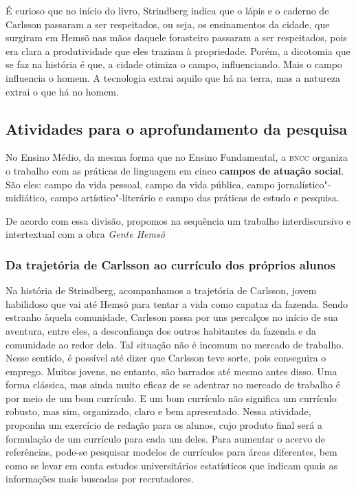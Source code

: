 \documentclass[12pt]{extarticle}
\begin{document}


É curioso que no início do livro, Strindberg indica que o lápis e o
caderno de Carlsson passaram a ser respeitados, ou seja, os ensinamentos
da cidade, que surgiram em Hemsö nas mãos daquele forasteiro passaram a
ser respeitados, pois era clara a produtividade que eles traziam à
propriedade. Porém, a dicotomia que se faz na história é que, a cidade
otimiza o campo, influenciando. Mais o campo influencia o homem. A
tecnologia extrai aquilo que há na terra, mas a natureza extrai o que há
no homem.




\subsection{Atividades para o aprofundamento da pesquisa}


No Ensino Médio, da mesma forma que no Ensino Fundamental, a \textsc{bncc}
organiza o trabalho com as práticas de linguagem em cinco \textbf{campos
de atuação social}. São eles: campo da vida pessoal, campo da vida
pública, campo jornalístico"-midiático, campo artístico"-literário e campo
das práticas de estudo e pesquisa.

De acordo com essa divisão, propomos na sequência um trabalho
interdiscursivo e intertextual com a obra \emph{Gente Hemsö}

\subsubsection{Da trajetória de Carlsson ao currículo dos próprios alunos}

Na história de Strindberg, acompanhamos a trajetória de Carlsson,
jovem habilidoso que vai até Hemsö para tentar a vida como capataz da
fazenda. Sendo estranho àquela comunidade, Carlsson passa por uns
percalços no início de sua aventura, entre eles, a desconfiança dos
outros habitantes da fazenda e da comunidade ao redor dela. Tal
situação não é incomum no mercado de trabalho. Nesse sentido, é
possível até dizer que Carlsson teve sorte, pois conseguira o emprego.
Muitos jovens, no entanto, são barrados até mesmo antes disso. Uma
forma clássica, mas ainda muito eficaz de se adentrar no mercado de
trabalho é por meio de um bom currículo. E um bom currículo não
significa um currículo robusto, mas sim, organizado, claro e bem
apresentado. Nessa atividade, proponha um exercício de redação para os
alunos, cujo produto final será a formulação de um currículo para cada
um deles. Para aumentar o acervo de referências, pode-se pesquisar
modelos de currículos para áreas diferentes, bem como se levar em
conta estudos universitários estatísticos que indicam quais as
informações mais buscadas por recrutadores.
\end{document}
